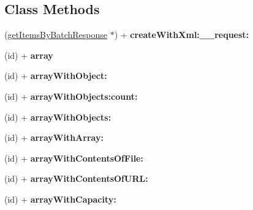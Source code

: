 \subsection*{Class Methods}
\begin{DoxyCompactItemize}
\item 
\hypertarget{interfaceget_items_by_batch_response_a3d07176f87a8c4732ebbaeb9398f3ac6}{}(\hyperlink{interfaceget_items_by_batch_response}{get\+Items\+By\+Batch\+Response} $\ast$) + {\bfseries create\+With\+Xml\+:\+\_\+\+\_\+request\+:}\label{interfaceget_items_by_batch_response_a3d07176f87a8c4732ebbaeb9398f3ac6}

\item 
\hypertarget{interfaceget_items_by_batch_response_ac3f7a25dd8a5b3056353bb0d89d17d2e}{}(id) + {\bfseries array}\label{interfaceget_items_by_batch_response_ac3f7a25dd8a5b3056353bb0d89d17d2e}

\item 
\hypertarget{interfaceget_items_by_batch_response_a541016db38da7e6458e5a91e62812b36}{}(id) + {\bfseries array\+With\+Object\+:}\label{interfaceget_items_by_batch_response_a541016db38da7e6458e5a91e62812b36}

\item 
\hypertarget{interfaceget_items_by_batch_response_acad41b8c202968f1f17a061f15a1c79d}{}(id) + {\bfseries array\+With\+Objects\+:count\+:}\label{interfaceget_items_by_batch_response_acad41b8c202968f1f17a061f15a1c79d}

\item 
\hypertarget{interfaceget_items_by_batch_response_ac670f67fa676626e39177978933cc583}{}(id) + {\bfseries array\+With\+Objects\+:}\label{interfaceget_items_by_batch_response_ac670f67fa676626e39177978933cc583}

\item 
\hypertarget{interfaceget_items_by_batch_response_a00f0434c3f58630775766fb7348d23a1}{}(id) + {\bfseries array\+With\+Array\+:}\label{interfaceget_items_by_batch_response_a00f0434c3f58630775766fb7348d23a1}

\item 
\hypertarget{interfaceget_items_by_batch_response_a7c34cfe011b57a75dff0a38d3470a20d}{}(id) + {\bfseries array\+With\+Contents\+Of\+File\+:}\label{interfaceget_items_by_batch_response_a7c34cfe011b57a75dff0a38d3470a20d}

\item 
\hypertarget{interfaceget_items_by_batch_response_a1701c0ef3de70438346923fc2b2ccfee}{}(id) + {\bfseries array\+With\+Contents\+Of\+U\+R\+L\+:}\label{interfaceget_items_by_batch_response_a1701c0ef3de70438346923fc2b2ccfee}

\item 
\hypertarget{interfaceget_items_by_batch_response_a95756bd2efaa8720a9e5686dfe78d779}{}(id) + {\bfseries array\+With\+Capacity\+:}\label{interfaceget_items_by_batch_response_a95756bd2efaa8720a9e5686dfe78d779}

\end{DoxyCompactItemize}
